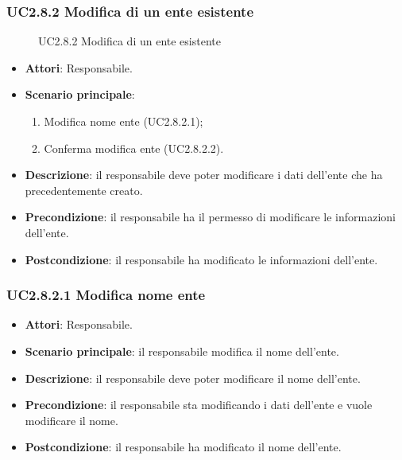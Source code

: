 \subsubsection{UC2.8.2 Modifica di un ente esistente}
\begin{figure}[H]
\centering
\noindent{}
\caption{UC2.8.2 Modifica di un ente esistente}
\end{figure}
\begin{itemize}
\item \textbf{Attori}: Responsabile.
\item \textbf{Scenario principale}:
\begin{enumerate}
\item Modifica nome ente (UC2.8.2.1);
\item Conferma modifica ente (UC2.8.2.2).
\end{enumerate}
\item \textbf{Descrizione}: il responsabile deve poter modificare i dati dell’ente che ha precedentemente creato.
\item \textbf{Precondizione}: il responsabile ha il permesso di modificare le informazioni dell’ente.
\item \textbf{Postcondizione}: il responsabile ha modificato le informazioni dell’ente.
\end{itemize}
\subsubsection{UC2.8.2.1 Modifica nome ente}
\begin{itemize}
\item \textbf{Attori}: Responsabile.
\item \textbf{Scenario principale}: il responsabile modifica il nome dell'ente.
\item \textbf{Descrizione}: il responsabile deve poter modificare il nome dell'ente.
\item \textbf{Precondizione}: il responsabile sta modificando i dati dell'ente e vuole modificare il nome.
\item \textbf{Postcondizione}: il responsabile ha modificato il nome dell'ente.
\end{itemize}
